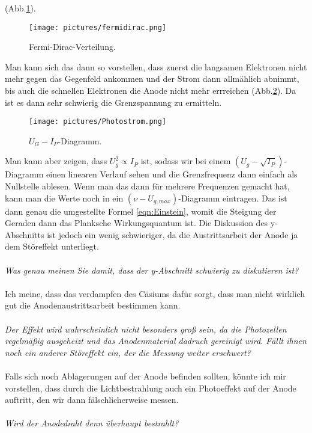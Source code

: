 (Abb.\ref{fig:Fermi}). 
\begin{figure}[H]
    \centering
    \texttt{[image: pictures/fermidirac.png]}
    \caption{Fermi-Dirac-Verteilung. \cite{AP03}}
    \label{fig:Fermi}
\end{figure}
\noindent
Man kann sich das dann so vorstellen, dass zuerst die langsamen Elektronen nicht mehr gegen das Gegenfeld ankommen 
und der Strom dann allmählich abnimmt, bis auch die schnellen Elektronen die Anode nicht mehr errreichen (Abb.\ref{fig:U-I}). Da ist es dann
sehr schwierig die Grenzspannung zu ermitteln. 
\begin{figure}[H]
    \centering
    \texttt{[image: pictures/Photostrom.png]}
    \caption{$U_G-I_P$-Diagramm. \cite{AP01}}
    \label{fig:U-I}
\end{figure}
\noindent 
Man kann aber zeigen, dass $U_{g}^2\propto I_{P}$ ist, sodass wir bei einem 
$(U_g-\sqrt{I_P})$-Diagramm einen linearen Verlauf sehen und die Grenzfrequenz dann einfach als Nullstelle ablesen. Wenn man das dann für 
mehrere Frequenzen gemacht hat, kann man die Werte noch in ein $(\nu-U_{g,max})$-Diagramm eintragen. Das ist dann genau die umgestellte Formel 
\ref{eqn:Einstein}, womit die Steigung der Geraden dann das Planksche Wirkungsquantum ist. Die Diskussion des y-Abschnitts ist jedoch ein 
wenig schwieriger, da die Austrittsarbeit der Anode ja dem Störeffekt unterliegt.
\\\\\noindent
\textit{Was genau meinen Sie damit, dass der y-Abschnitt schwierig zu diskutieren ist?}
\\\\\noindent
Ich meine, dass das verdampfen des Cäsiums dafür sorgt, dass man nicht wirklich gut die Anodenaustrittsarbeit bestimmen kann. 
\\\\\noindent
\textit{Der Effekt wird wahrscheinlich nicht besonders groß sein, da die Photozellen regelmäßig ausgeheizt und das Anodenmaterial 
dadruch gereinigt wird. Fällt ihnen noch ein anderer Störeffekt ein, der die Messung weiter erschwert?}
\\\\\noindent
Falls sich noch Ablagerungen auf der Anode befinden sollten, könnte ich mir vorstellen, dass durch die Lichtbestrahlung auch ein Photoeffekt auf
der Anode auftritt, den wir dann fälschlicherweise messen.
\\\\\noindent
\textit{Wird der Anodedraht denn überhaupt bestrahlt?}
